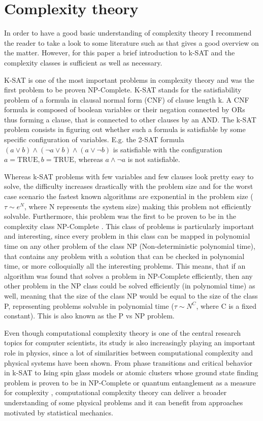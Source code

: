 \section{Complexity theory}
In order to have a good basic understanding of complexity theory I recommend the reader to take a look to some literature such as \cite{Garey} that gives a good overview on the matter. However, for this paper a brief introduction to k-SAT and the complexity classes is sufficient as well as necessary.

K-SAT is one of the most important problems in complexity theory and was the first problem to be proven NP-Complete. K-SAT stands for the satisfiability problem of a formula in clausal normal form (CNF) of clause length k. A CNF formula is composed of boolean variables or their negation connected by ORs thus forming a clause, that is connected to other clauses by an AND. The k-SAT problem consists in figuring out whether such a formula is satisfiable by some specific configuration of variables. E.g. the 2-SAT formula $(a \vee b) \wedge (\neg a \vee b) \wedge (a \vee \neg b)$ is satisfiable with the configuration $a=\text{TRUE}, b=\text{TRUE}$, whereas $a \wedge \neg a$ is not satisfiable.

Whereas k-SAT problems with few variables and few clauses look pretty easy to solve, the difficulty increases drastically with the problem size and for the worst case scenario the fastest known algorithms are exponential in the problem size ($\tau \sim e^N$, where N represents the system size) making this problem not efficiently solvable. Furthermore, this problem was the first to be proven to be in the complexity class NP-Complete \cite{Cook}.
This class of problems is particularly important and interesting, since every problem in this class can be mapped in polynomial time on any other problem of the class NP (Non-deterministic polynomial time), that contains any problem with a solution that can be checked in polynomial time, or more colloquially all the interesting problems.
This means, that if an algorithm was found that solves a problem in NP-Complete efficiently, then any other problem in the NP class could be solved efficiently (in polynomial time) as well, meaning that the size of the class NP would be equal to the size of the class P, representing problems solvable in polynomial time ($\tau \sim N^C$, where C is a fixed constant). This is also known as the P vs NP problem.

Even though computational complexity theory is one of the central research topics for computer scientists, its study is also increasingly playing an important role in physics, since a lot of similarities between computational complexity and physical systems have been shown.
From phase transitions \cite{Monasson} and critical behavior in k-SAT  \cite{Kirkpatrick} to Ising spin glass models or atomic clusters whose ground state finding problem is proven to be in NP-Complete \cite{Barahona} or quantum entanglement as a measure for complexity \cite{Chamon_entropies}, computational complexity theory can deliver a broader understanding of some physical problems and it can benefit from approaches motivated by statistical mechanics.

